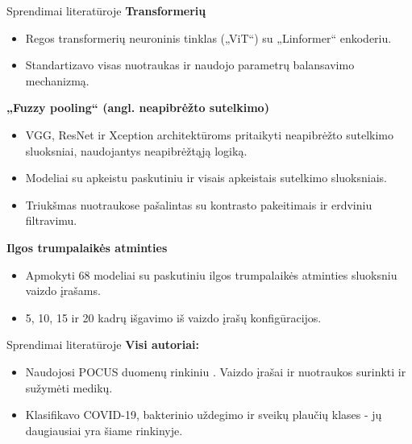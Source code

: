 \documentclass{VUMIFSlides}
\begin{document}
\begin{frame}[c]{Sprendimai literatūroje}{}
    {\bf Transformerių \cite{PAY21}}
    \begin{itemize}
        \item Regos transformerių neuroninis tinklas („ViT“) su „Linformer“ enkoderiu.
        \item Standartizavo visas nuotraukas ir naudojo parametrų balansavimo mechanizmą.
    \end{itemize}
    \vspace{0.3cm}
    {\bf „Fuzzy pooling“ (angl. neapibrėžto sutelkimo) \cite{HASAN2023}}
    \begin{itemize}
        \item VGG, ResNet ir Xception architektūroms pritaikyti neapibrėžto sutelkimo sluoksniai, naudojantys neapibrėžtąją logiką.
        \item Modeliai su apkeistu paskutiniu ir visais apkeistais sutelkimo sluoksniais. 
        \item Triukšmas nuotraukose pašalintas su kontrasto pakeitimais ir erdviniu filtravimu. 
    \end{itemize}
    \vspace{0.3cm}
    {\bf Ilgos trumpalaikės atminties \cite{LSTM}}
    \begin{itemize}
        \item Apmokyti 68 modeliai su paskutiniu ilgos trumpalaikės atminties sluoksniu vaizdo įrašams.
        \item 5, 10, 15 ir 20 kadrų išgavimo iš vaizdo įrašų konfigūracijos.
    \end{itemize}
\end{frame}

\begin{frame}[c]{Sprendimai literatūroje}{}
{\bf Visi autoriai:}
\begin{itemize}
        \item Naudojosi POCUS duomenų rinkiniu \cite{born2021accelerating}. Vaizdo įrašai ir nuotraukos surinkti ir sužymėti medikų.
        \item Klasifikavo COVID-19, bakterinio uždegimo ir sveikų plaučių klases - jų daugiausiai yra šiame rinkinyje.
\end{itemize}
\end{frame}
\end{document}
